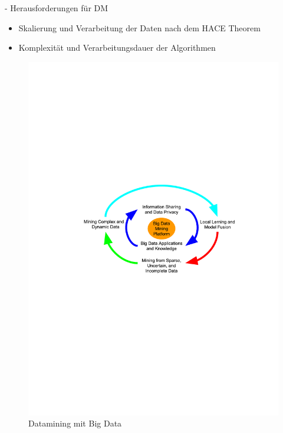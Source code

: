 \documentclass[fleqn,11pt,aspectratio=43]{beamer}
\begin{document}
\begin{frame}{\insertsectionhead - Herausforderungen für DM \cite{wu2014data}}
\begin{itemize} 
\item Skalierung und Verarbeitung der Daten nach dem HACE Theorem
\item Komplexität und Verarbeitungsdauer der Algorithmen
\end{itemize}
\vspace{-0.5em}
\begin{figure} %
\includegraphics[scale=0.65,trim={120 340 100 280},clip]{img/bigdata42.pdf}
\caption{Datamining mit Big Data \cite{wu2014data}}
\label{bigdata}
\end{figure}
\end{frame}
\end{document}
